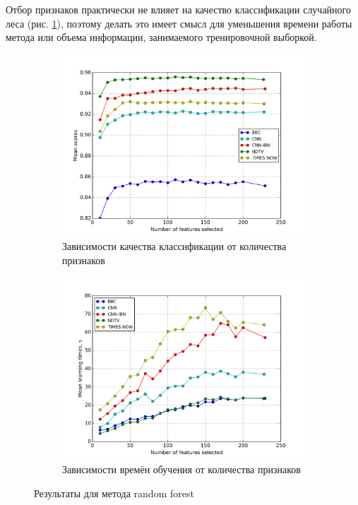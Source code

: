 \par
Отбор признаков практически не влияет на качество классификации случайного леса (рис. \ref{fig:randfor_rfs}), поэтому делать это имеет  смысл для уменьшения времени работы метода или объема информации, занимаемого тренировочной выборкой.

\begin{figure}[h!]
    \centering
	\begin{subfigure}{0.45\textwidth}
		\includegraphics[width=\textwidth]{images/RFS-randforest.png}
		\caption{Зависимости качества классификации от количества признаков}
	\end{subfigure}
	\begin{subfigure}{0.45\textwidth}
		\includegraphics[width=\textwidth]{images/RFS-randforestTime.png}
		\caption{Зависимости времён обучения от количества признаков}
	\end{subfigure}
	\caption{Результаты для метода random forest}\label{fig:randfor_rfs}
\end{figure} 

